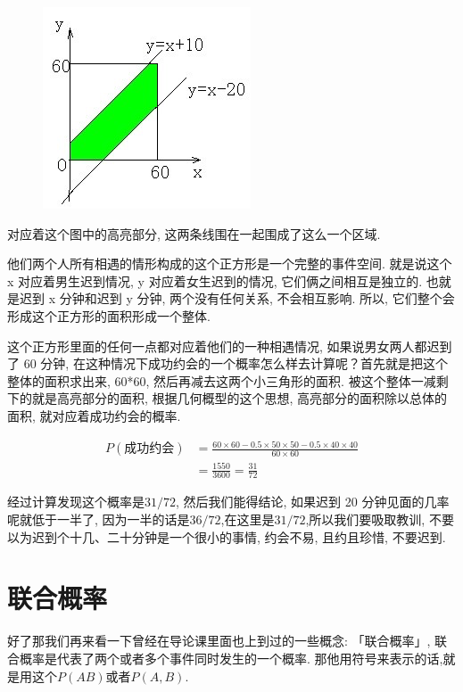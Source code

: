 \begin{figure}[ht]
  \centering
  \includegraphics[width=0.4\linewidth]{asset/20230916204154.png}
  \caption{}
  \label{fig:img21_2}
\end{figure}

对应着这个图中的高亮部分, 这两条线围在一起围成了这么一个区域. 

他们两个人所有相遇的情形构成的这个正方形是一个完整的事件空间. 就是说这个 x 对应着男生迟到情况, y 对应着女生迟到的情况, 它们俩之间相互是独立的. 也就是迟到 x 分钟和迟到 y 分钟, 两个没有任何关系, 不会相互影响. 所以, 它们整个会形成这个正方形的面积形成一个整体. 

这个正方形里面的任何一点都对应着他们的一种相遇情况, 如果说男女两人都迟到了 60 分钟, 在这种情况下成功约会的一个概率怎么样去计算呢？首先就是把这个整体的面积求出来, 60*60, 然后再减去这两个小三角形的面积. 被这个整体一减剩下的就是高亮部分的面积, 根据几何概型的这个思想, 高亮部分的面积除以总体的面积, 就对应着成功约会的概率. 

\begin{align*}
  P(\mbox{成功约会}) & = \frac{60 \times 60 - 0.5 \times 50 \times 50 - 0.5 \times 40 \times 40}{60 \times 60} \\
  & = \frac{1550}{3600}
  = \frac{31}{72}
\end{align*}

经过计算发现这个概率是$31/72$, 然后我们能得结论, 如果迟到 20 分钟见面的几率呢就低于一半了, 因为一半的话是$36/72$,在这里是$31/72$,所以我们要吸取教训, 不要以为迟到个十几、二十分钟是一个很小的事情, 约会不易, 且约且珍惜, 不要迟到. 

\section{联合概率}

好了那我们再来看一下曾经在导论课里面也上到过的一些概念: 「联合概率」, 联合概率是代表了两个或者多个事件同时发生的一个概率. 那他用符号来表示的话,就是用这个$P(AB)$或者$P(A,B)$. 

